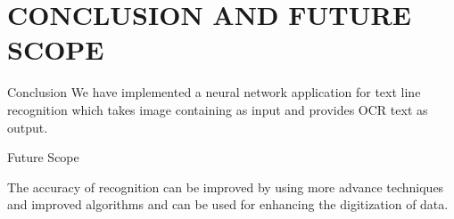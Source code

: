 \chapter{CONCLUSION AND FUTURE SCOPE}
Conclusion
 We have implemented a neural network application for text line recognition which takes image containing as input and provides OCR text as output.

Future Scope

The accuracy of recognition can be improved by using more advance techniques and improved algorithms and can be used for enhancing the digitization of data.

